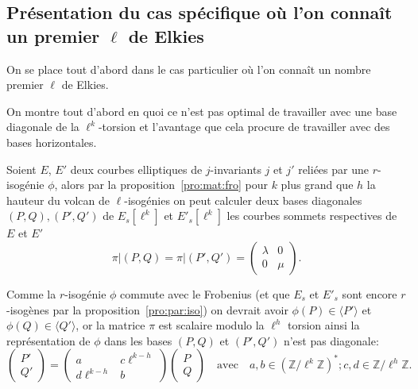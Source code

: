 \documentclass[10pt,a4paper]{book}
\theoremstyle{plain}
\theoremstyle{definition}
\theoremstyle{definition}
\theoremstyle{definition}
\theoremstyle{definition}
\theoremstyle{remark}
\theoremstyle{remark}
\theoremstyle{definition}
\begin{document}
\subsection{Présentation du cas spécifique où l'on connaît un premier $\ell$ de Elkies}
\label{ssec:cou:elk}
On se place tout d'abord dans le cas particulier où l'on connaît un nombre 
premier $\ell$  de Elkies.

On montre tout d'abord en quoi ce n'est pas optimal de travailler avec une base
diagonale de la $\ell^k$-torsion et l'avantage que cela procure de travailler 
avec des bases horizontales.

Soient $E$, $E'$ deux courbes elliptiques de $j$-invariants $j$ et $j'$ reliées par une $r$-isogénie $\phi$, alors par la proposition~\ref{pro:mat:fro} pour $k$ plus grand que $h$ la hauteur du volcan de $\ell$-isogénies on peut calculer deux bases diagonales $(P,Q),(P',Q')$ de $E_s[\ell^k]$ et $E'_s[\ell^k]$ les courbes sommets respectives de $E$ et $E'$ 
\[
\pi|(P,Q)=\pi|(P',Q')= \left( \begin{matrix}
\lambda & 0 \\
0 & \mu
\end{matrix} \right).
\]

Comme la $r$-isogénie $\phi$ commute avec le Frobenius (et que $E_s$ et $E'_s$ sont encore $r$-isogènes par la proposition~\ref{pro:par:iso}) on devrait avoir $\phi(P) \in \langle P' \rangle $ et $\phi(Q) \in \langle Q' \rangle $, or la matrice $\pi$ est scalaire modulo la $\ell^{h}$ torsion ainsi la représentation de $\phi$ dans les bases $(P,Q)$ et $(P',Q')$ n'est pas diagonale:
\[
\left(
\begin{matrix}
P' \\
Q'
\end{matrix}
\right)=
\left( 
\begin{matrix}
a &  c\ell^{k-h} \\
d\ell^{k-h} & b
\end{matrix}
\right)
\left(
\begin{matrix}
P \\
Q
\end{matrix}
\right) \quad \text{avec} \quad a,b \in \left( \mathbb{Z}/\ell^k\mathbb{Z} \right)^*; c,d \in \mathbb{Z}/\ell^{h}\mathbb{Z}.
\]
\end{document}
